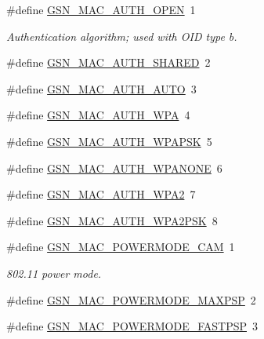\begin{DoxyCompactItemize}
\item 
\#define \hyperlink{a00642_ga1153f0727bac49c704c19659c6af8126}{GSN\_\-MAC\_\-AUTH\_\-OPEN}~1
\begin{DoxyCompactList}\small\item\em Authentication algorithm; used with OID type b. \end{DoxyCompactList}\item 
\#define \hyperlink{a00642_gaf44feac70f9ce6dc783578b7ccc2f8a3}{GSN\_\-MAC\_\-AUTH\_\-SHARED}~2
\item 
\#define \hyperlink{a00642_gab184a6403ca2858aefd8100162c3d123}{GSN\_\-MAC\_\-AUTH\_\-AUTO}~3
\item 
\#define \hyperlink{a00642_ga0a443ae2a1e4873621cdbb480dc8a7fc}{GSN\_\-MAC\_\-AUTH\_\-WPA}~4
\item 
\#define \hyperlink{a00642_gab69f885fde7c0cc3a634bdb6c59137b4}{GSN\_\-MAC\_\-AUTH\_\-WPAPSK}~5
\item 
\#define \hyperlink{a00642_gac24885ac3891945ce4609aa30ef41a04}{GSN\_\-MAC\_\-AUTH\_\-WPANONE}~6
\item 
\#define \hyperlink{a00642_gacffb560e436c18bd91375b8f3ecda578}{GSN\_\-MAC\_\-AUTH\_\-WPA2}~7
\item 
\#define \hyperlink{a00642_gafdd52a10528e2f3e5277f4ecc458e3b9}{GSN\_\-MAC\_\-AUTH\_\-WPA2PSK}~8
\end{DoxyCompactItemize}
\begin{DoxyCompactItemize}
\item 
\#define \hyperlink{a00642_ga8562dc7df79490dc400c2a694356c55d}{GSN\_\-MAC\_\-POWERMODE\_\-CAM}~1
\begin{DoxyCompactList}\small\item\em 802.11 power mode. \end{DoxyCompactList}\item 
\#define \hyperlink{a00642_ga751f71fb490748186b9e7ffc85d77b74}{GSN\_\-MAC\_\-POWERMODE\_\-MAXPSP}~2
\item 
\#define \hyperlink{a00642_ga4533fe3149beb1276a66d8d703fb8c4a}{GSN\_\-MAC\_\-POWERMODE\_\-FASTPSP}~3
\end{DoxyCompactItemize}

